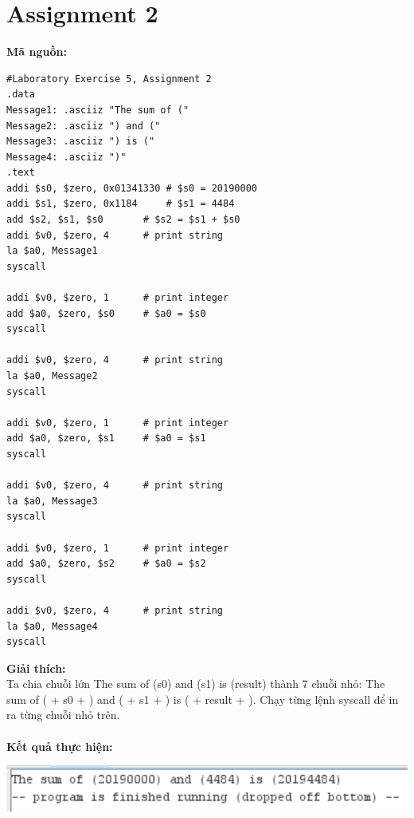 \documentclass[12pt,a4paper,oneside]{article}
\begin{document}
\section*{Assignment 2}
\textbf{Mã nguồn: }
\begin{lstlisting}
#Laboratory Exercise 5, Assignment 2
.data
Message1: .asciiz "The sum of ("
Message2: .asciiz ") and ("
Message3: .asciiz ") is ("
Message4: .asciiz ")"
.text
addi $s0, $zero, 0x01341330	# $s0 = 20190000
addi $s1, $zero, 0x1184		# $s1 = 4484
add $s2, $s1, $s0		# $s2 = $s1 + $s0
addi $v0, $zero, 4 		# print string
la $a0, Message1		
syscall

addi $v0, $zero, 1 		# print integer
add $a0, $zero, $s0		# $a0 = $s0
syscall

addi $v0, $zero, 4 		# print string
la $a0, Message2
syscall 

addi $v0, $zero, 1 		# print integer
add $a0, $zero, $s1		# $a0 = $s1
syscall

addi $v0, $zero, 4 		# print string
la $a0, Message3
syscall 

addi $v0, $zero, 1 		# print integer
add $a0, $zero, $s2		# $a0 = $s2
syscall

addi $v0, $zero, 4 		# print string
la $a0, Message4
syscall
\end{lstlisting}
\textbf{Giải thích:}\\
Ta chia chuỗi lớn \colorbox{code}{The sum of (s0) and (s1) is (result)} thành 7 chuỗi nhỏ:
\colorbox{code}{The sum of (} + \colorbox{code}{s0} + \colorbox{code}{) and (} + \colorbox{code}{s1} + \colorbox{code}{) is (} + \colorbox{code}{result} + \colorbox{code}{)}. Chạy từng lệnh syscall để in ra từng chuỗi nhỏ trên.\\
\\\textbf{Kết quả thực hiện: }
\begin{center}
\includegraphics[scale=1]{2}
\end{center}
\pagebreak
\end{document}
